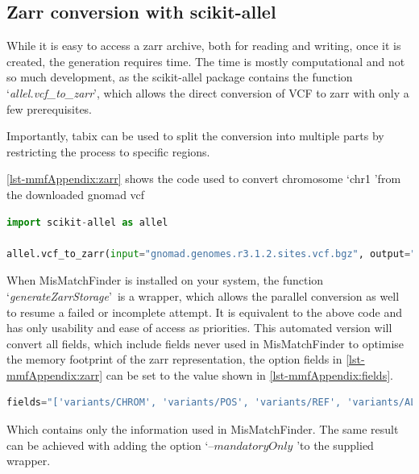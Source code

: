 \subsection{Zarr conversion with scikit-allel}
\label{ch-mmfAppendix:zarr}
While it is easy to access a zarr archive, both for reading and writing, once it is created, the generation requires time. The time is mostly computational and not so much development, as the scikit-allel package contains the function \lq\emph{allel.vcf\_to\_zarr}\rq, which allows the direct conversion of VCF to zarr with only a few prerequisites. 

Importantly, tabix \cite{Li2011} can be used to split the conversion into multiple parts by restricting the process to specific regions.

\autoref{lst-mmfAppendix:zarr} shows the code used to convert chromosome \lq chr1 \rq from the downloaded gnomad vcf

\begin{lstlisting}[language=Python, caption=scikit-allel conversion vcf\_to\_zarr, label={lst-mmfAppendix:zarr}]
import scikit-allel as allel

allel.vcf_to_zarr(input="gnomad.genomes.r3.1.2.sites.vcf.bgz", output="/out/put/folder/",  group="chr1", region="chr1", fields="*")
\end{lstlisting}

When MisMatchFinder is installed on your system, the function \lq\emph{generateZarrStorage}\rq\ is a wrapper, which allows the parallel conversion as well to resume a failed or incomplete attempt. It is equivalent to the above code and has only usability and ease of access as priorities. This automated version will convert all fields, which include fields never used in MisMatchFinder to optimise the memory footprint of the zarr representation, the option fields in \autoref{lst-mmfAppendix:zarr} can be set to the value shown in \autoref{lst-mmfAppendix:fields}.
\begin{lstlisting}[language=Python, caption=field options for reduced memory, label={lst-mmfAppendix:fields}]
fields="['variants/CHROM', 'variants/POS', 'variants/REF', 'variants/ALT', 'variants/AF', 'variants/FILTER_PASS']"
\end{lstlisting}
Which contains only the information used in MisMatchFinder. The same result can be achieved with adding the option \lq --$mandatoryOnly$ \rq to the supplied wrapper.


